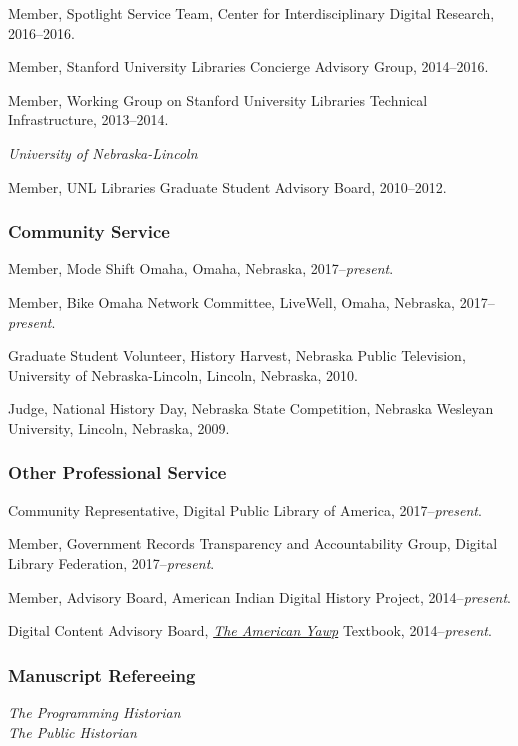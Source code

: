 Member, Spotlight Service Team, Center for Interdisciplinary Digital
Research, 2016--2016.

Member, Stanford University Libraries Concierge Advisory Group,
2014--2016.

Member, Working Group on Stanford University Libraries Technical
Infrastructure, 2013--2014.

\vspace{.4cm}

\emph{University of Nebraska-Lincoln}

Member, UNL Libraries Graduate Student Advisory Board, 2010--2012.

\subsubsection{Community Service}\label{community-service}

Member, Mode Shift Omaha, Omaha, Nebraska, 2017--\emph{present}.

Member, Bike Omaha Network Committee, LiveWell, Omaha, Nebraska,
2017--\emph{present}.

Graduate Student Volunteer, History Harvest, Nebraska Public Television,
University of Nebraska-Lincoln, Lincoln, Nebraska, 2010.

Judge, National History Day, Nebraska State Competition, Nebraska
Wesleyan University, Lincoln, Nebraska, 2009.

\subsubsection{Other Professional
Service}\label{other-professional-service}

Community Representative, Digital Public Library of America,
2017--\emph{present}.

Member, Government Records Transparency and Accountability Group,
Digital Library Federation, 2017--\emph{present}.

Member, Advisory Board, American Indian Digital History Project,
2014--\emph{present}.

Digital Content Advisory Board, \emph{\href{http://americanyawp.com}{The
American Yawp}} Textbook, 2014--\emph{present}.

\subsubsection{Manuscript Refereeing}\label{manuscript-refereeing}

\emph{The Programming Historian}\\
\emph{The Public Historian}
